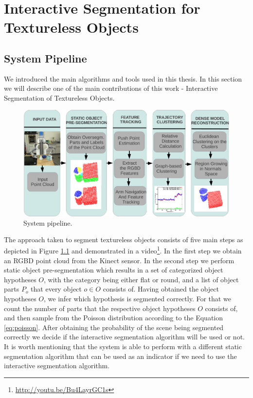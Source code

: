 \chapter{Interactive Segmentation for Textureless Objects}
\label{chapter:Textureless Segmentation}


\section{System Pipeline}



 We introduced the main algorithms and tools used in this thesis. In this section we will describe one of the main contributions of this work - Interactive Segmentation of Textureless Objects.
 
\begin{figure}[h!]
\centering
  \includegraphics[width=\columnwidth]{figures/segmentation_pipeline.pdf}
  \caption{System pipeline.}
  \label{fig:pipeline}
\end{figure} 
 
 The approach taken to segment textureless objects   
 consists of five main steps as depicted in Figure \ref{fig:pipeline}
  and demonstrated in a video\footnote{\url{http://youtu.be/Bu4LayrGC1s}}.
 In the first step we obtain an RGBD point cloud from the Kinect sensor. In the second step we perform static object
 pre-segmentation which results in a set of categorized object hypotheses $O$,
 with the category being either flat or round, and a list of object parts $P_{o}$ that every object 
 $o \in O$ consists of. Having obtained the object hypotheses $O$, we infer which hypothesis
 is segmented  correctly. For
 that we count the  number of parts that the respective object hypotheses $O$ 
 consists of, and then sample from the Poisson distribution according to the Equation \ref{eq:poisson}.
 After obtaining the probability of the scene being segmented correctly we 
decide if the interactive segmentation algorithm will be used or not. It is worth mentioning that the system is able to perform with a different static segmentation algorithm that can be used as an indicator if we need to use the interactive segmentation algorithm.





